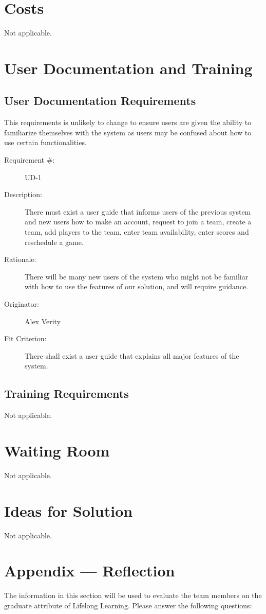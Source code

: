 \documentclass[12pt]{article}
\newenvironment{myreq}[1]{%
\setlist[description]{font=\normalfont\color{darkgray}}%
\begin{tcolorbox}[colframe=black,colback=white, sharp corners, boxrule=1pt]%
\bfseries\color{blue}%
\begin{description}#1}%
{\end{description}\end{tcolorbox}}
\newcommand{\twoinline}[2]{\begin{multicols}{2}#1 #2\end{multicols}}
\newcommand{\reqno}{\item[Requirement \#:]}
\newcommand{\reqdesc}{\item[Description:]}
\newcommand{\reqrat}{\item[Rationale:]}
\newcommand{\reqorig}{\item[Originator:]}
\newcommand{\reqfit}{\item[Fit Criterion:]}
\newcommand{\reqsatis}{\item[Customer Satisfaction:]}
\newcommand{\reqdissat}{\item[Customer Dissatisfaction:]}
\begin{document}
\section{Costs}
Not applicable.
\section{User Documentation and Training}
\subsection{User Documentation Requirements}

This requirements is unlikely to change to ensure users are given the ability to familiarize
themselves with the system as users may be confused about how to use certain functionalities. 

\begin{myreq}
  \reqno UD-1
  \reqdesc There must exist a user guide that informs users of the previous
  system and new users how to make an account, request to join a team, create
  a team, add players to the team, enter team availability, enter scores and
  reschedule a game.
  \reqrat There will be many new users of the system who might not be familiar
  with how to use the features of our solution, and will require guidance.
  \reqorig Alex Verity
  \reqfit There shall exist a user guide that explains all major features of
  the system.
  \twoinline
    {\reqsatis 3}
    {\reqdissat 1}
\end{myreq}

\subsection{Training Requirements}
Not applicable.

\section{Waiting Room}
Not applicable.

\section{Ideas for Solution}
Not applicable.

\newpage{}
\section*{Appendix --- Reflection}

The information in this section will be used to evaluate the team members on the
graduate attribute of Lifelong Learning.  Please answer the following questions:
\end{document}
